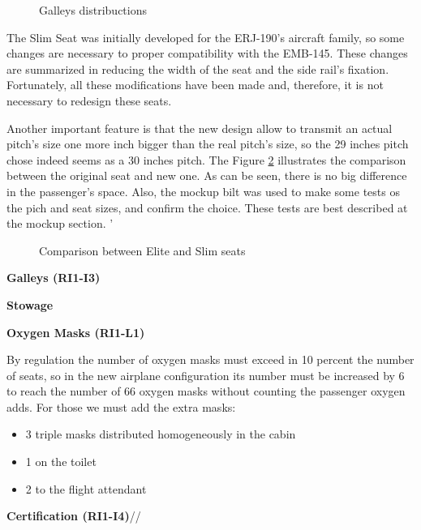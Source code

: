 \begin{figure}[H]
\caption{Galleys distribuctions}
\label{fig:slimseatside}
\end{figure}

The Slim Seat was initially developed for the ERJ-190's aircraft family, so some changes are necessary to proper compatibility with the EMB-145. These changes are summarized in reducing the width of the seat and the side rail's fixation. Fortunately, all these modifications have been made and, therefore, it is not necessary to redesign these seats.


Another important feature is that the new design allow to transmit an actual pitch's size one more inch bigger than the real pitch's size, so the 29 inches pitch chose indeed seems as a 30 inches pitch. The Figure \ref{fig:slimelitecomparison} illustrates the comparison between the original seat and new one. As can be seen, there is no big difference in the passenger's space. Also, the mockup bilt was used to make some tests os the pich and seat sizes, and confirm the choice. These tests are best described at the mockup section. '

\begin{figure}[H]
\caption{Comparison between Elite and Slim seats}
\label{fig:slimelitecomparison}
\end{figure}


\textbf{Galleys (RI1-I3)}


\textbf{Stowage}


\textbf{Oxygen Masks (RI1-L1)}

By regulation the number of oxygen masks must exceed in 10 percent the number of seats, so in the new airplane configuration its number must be increased by 6 to reach the number of 66 oxygen masks without counting the passenger oxygen adds.
For those we must add the extra masks:

\begin{itemize}
  \item 3 triple masks distributed homogeneously in the cabin
  \item 1 on the toilet
  \item 2 to the flight attendant
\end{itemize}

\textbf{Certification (RI1-I4)}//





